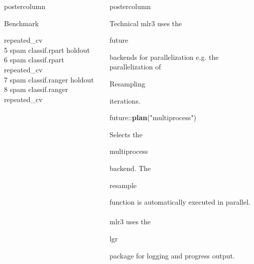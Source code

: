 \documentclass{beamer}
\newlength{\columnheight} %
\newcommand{\codeinline}[1]{\begin{codeboxinline}#1\end{codeboxinline}}
\begin{document}
\begin{withoutheader}
\begin{frame}[fragile]{}
\begin{columns}
\begin{column}{.245\textwidth}
\begin{beamercolorbox}[center]{postercolumn}
\begin{minipage}{.98\textwidth}
{\begin{myblock}{Benchmark}
\begin{codeboxmultiline}[width=27cm]
{								\space\space repeated\_cv
								\space{}
								\space\space\space\space\space\space\space 0
								\space\space\space\space{}\\
								5 \space\space\space\space spam
								\space classif.rpart
								\space\space\space\space\space\space holdout
								\space\space\space\space 1
								\space\space\space\space\space\space{}
								\space\space\space\space\space 0\\
								6 \space\space\space\space spam
								\space  classif.rpart
								\space\space repeated\_cv
								\space{}00
								\space\space\space\space\space\space{}
								\space\space\space\space{}\\
								7 \space\space\space\space spam
								classif.ranger
								\space\space\space\space\space\space holdout
								\space\space\space\space 1
								\space\space\space\space\space\space\space 0
								\space\space\space\space\space 0\\
								8 \space\space\space\space spam
								classif.ranger
								\space\space repeated\_cv
								\space{}
								\space\space\space\space\space\space{}
								\space\space\space\space{}
							}
						\end{codeboxmultiline}
					\end{myblock}
					\vfill
					}
				\end{minipage}
			\end{beamercolorbox}
		\end{column}
		\begin{column}{.245\textwidth}
			\begin{beamercolorbox}[center]{postercolumn}
				\begin{minipage}{.98\textwidth}
					\parbox[t][\columnheight]{\textwidth}{
						\begin{myblock}{Technical}
							{mlr3} uses the \codeinline{future} backends for parallelization e.g. the parallelization of \codeinline{Resampling} iterations.\\
							\begin{codebox}
								future::\textbf{plan}("multiprocess")
							\end{codebox}
							Selects the \codeinline{multiprocess} backend. The \codeinline{resample} function is automatically executed in parallel.
							\\
							\\
							{mlr3} uses the \codeinline{lgr} package for logging and progress output.

\end{myblock}}
\end{minipage}
\end{beamercolorbox}
\end{column}
\end{columns}
\end{frame}
\end{withoutheader}
\end{document}
